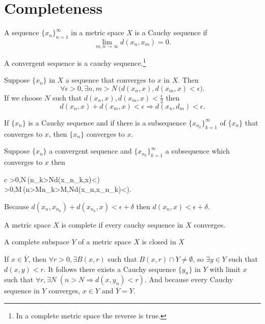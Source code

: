 \documentclass[nobib,notoc]{tufte-handout}
\begin{document}
\section{Completeness}
\begin{defi}
	A sequence \(\{x_n\}_{n=1}^{\infty}\) in a metric space \(X\) is a Cauchy sequence if
	\begin{equation*}
		\lim_{m,n\rightarrow\infty}d(x_n,x_m)=0.
	\end{equation*}
\end{defi}
\begin{lem}
	A convergent sequence is a cauchy sequence.\footnote{In a complete metric space the reverse is true.}
	\begin{IEEEproof}
		Suppose \(\{x_n\}\) in \(X\) a sequence that converges to \(x\) in \(X\). Then
		\begin{equation*}
			\forall\epsilon>0,\exists n,m>N\,\big(d(x_n,x),d(x_m,x)<\epsilon\big).
		\end{equation*}
		If we choose \(N\) such that \(d(x_n,x),d(x_m,x)<\frac{\epsilon}{2}\) then
		\begin{equation*}
			d(x_n,x)+d(x_m,x)<\epsilon\Rightarrow d(x_n,d_m)<\epsilon.
		\end{equation*}
	\end{IEEEproof}
\end{lem}
\begin{lem}
	If \(\{x_n\}\) is a Cauchy sequence and if there is a subsequence \(\{x_{n_k}\}_{k=1}^{\infty}\) of \(\{x_n\}\) that converges to \(x\), then \(\{x_n\}\) converges to \(x\).
	\begin{IEEEproof}
		Suppose \(\{x_n\}\) a convergent sequence and \(\{x_{n_k}\}_{k=1}^{\infty}\) a subsequence which converges to \(x\) then
		\begin{IEEEeqnarray*}{c}
			\forall\delta>0,\exists N\,(n_k>N\Rightarrow d(x_{n_k},x)<\delta)\\
			\forall\epsilon>0,\exists M\,(n>M\wedge n_k>M,N\Rightarrow d(x_n,x_{n_k})<\epsilon).
		\end{IEEEeqnarray*}
		Because \(d(x_n,x_{n_k})+d(x_{n_k},x)<\epsilon+\delta\) then \(d(x_n,x)<\epsilon+\delta\).
	\end{IEEEproof}
\end{lem}
\begin{defi}
	A metric space \(X\) is complete if every cauchy sequence in \(X\) converges.
\end{defi}
\begin{thm}
	A complete subspace \(Y\) of a metric space \(X\) is closed in \(X\)
	\begin{IEEEproof}
		If \(x\in\overline{Y}\), then \(\forall r>0,\exists B(x,r)\) such that \(B(x,r)\cap Y\neq\emptyset\), so \(\exists y\in Y\) such that \(d(x,y)<r\). It follows there exists a Cauchy sequence \(\{y_n\}\) in \(Y\) with limit \(x\) such that \(\forall r,\exists N\;(n>N\Rightarrow d(x,y_n)<r)\). And because every Cauchy sequence in \(Y\) converges, \(x\in Y\) and \(\overline{Y}=Y\).
	\end{IEEEproof}
\end{thm}
\end{document}
